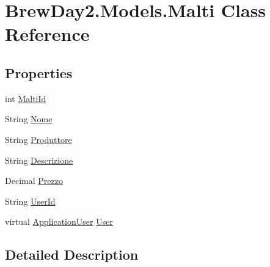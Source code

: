 \hypertarget{class_brew_day2_1_1_models_1_1_malti}{}\section{Brew\+Day2.\+Models.\+Malti Class Reference}
\label{class_brew_day2_1_1_models_1_1_malti}
\subsection*{Properties}
\begin{DoxyCompactItemize}
\item 
int \mbox{\hyperlink{class_brew_day2_1_1_models_1_1_malti_acfcec2658fd90f659c9b991774cd77ba}{Malti\+Id}}
\item 
String \mbox{\hyperlink{class_brew_day2_1_1_models_1_1_malti_a6d1fd68234ca11f71c50edd4a99e44fa}{Nome}}
\item 
String \mbox{\hyperlink{class_brew_day2_1_1_models_1_1_malti_af8245036b26db770c8a5cc678e19a128}{Produttore}}
\item 
String \mbox{\hyperlink{class_brew_day2_1_1_models_1_1_malti_a38043210e541d4ac3cd73189cc6ffef9}{Descrizione}}
\item 
Decimal \mbox{\hyperlink{class_brew_day2_1_1_models_1_1_malti_afe0822d2bb9d62271a83ebe8f644af2d}{Prezzo}}
\item 
String \mbox{\hyperlink{class_brew_day2_1_1_models_1_1_malti_a414f26850a0621fa52920477da285cfd}{User\+Id}}
\item 
virtual \mbox{\hyperlink{class_brew_day2_1_1_models_1_1_application_user}{Application\+User}} \mbox{\hyperlink{class_brew_day2_1_1_models_1_1_malti_a0f2548d30cfeca81d43add4872be3911}{User}}
\end{DoxyCompactItemize}


\subsection{Detailed Description}



